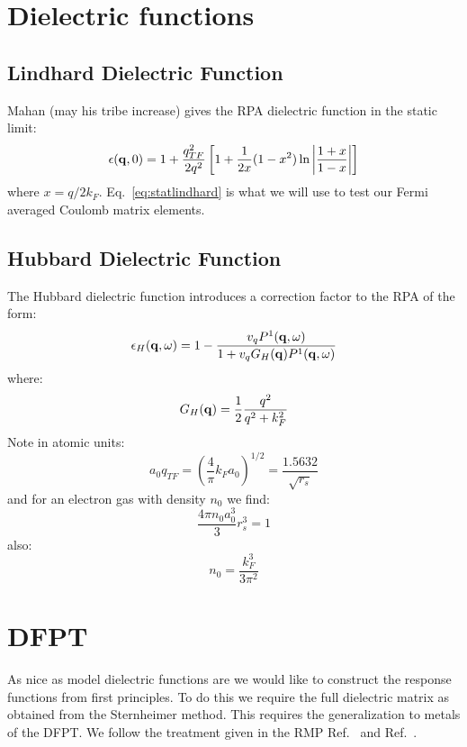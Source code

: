 \documentclass{article}
\def\q{{\bf q}}
\begin{document}
\section{Dielectric functions}
\subsection{Lindhard Dielectric Function}
Mahan (may his tribe increase) gives the RPA dielectric function in the static limit:
%
\begin{equation}
\label{eq:statlindhard}
\epsilon(\q,0) = 1 + \frac{q^{2}_{TF}}{2q^{2}}\left[1+\frac{1}{2x}(1-x^{2})\ln\left|\frac{1+x}{1-x}\right|\right]
\end{equation}
%
where $x = q/2k_{F}$.
Eq.~\ref{eq:statlindhard} is what we will use to test our Fermi averaged Coulomb matrix elements.

\subsection{Hubbard Dielectric Function}
The Hubbard dielectric function introduces a correction factor to the RPA of the form:
%
\begin{equation}
\epsilon_{H}(\q,\omega) = 1 - \frac{v_{q}P^{1}(\q,\omega)}{1+ v_{q}G_{H}(\q)P^{1}(\q,\omega)}
\end{equation}
%
where:
%
\begin{equation}
G_{H}(\q) = \frac{1}{2}\frac{q^{2}}{q^{2} + k^{2}_{F}}
\end{equation}
%
Note in atomic units:
%
\begin{equation}
a_{0}q_{TF} = (\frac{4}{\pi}k_{F}a_{0})^{1/2} = \frac{1.5632}{\sqrt{r_{s}}}
\end{equation}
%
and for an electron gas with density $n_{0}$ we find:
%
\begin{equation}
\frac{4\pi n_{0} a^{3}_{0}}{3}r^{3}_{s} = 1
\end{equation}
%
also: 
%
\begin{equation}
n_{0} = \frac{k^{3}_{F}}{3\pi^{2}}
\end{equation}

\section{DFPT}
As nice as model dielectric functions are we would like to construct the
response functions from first principles. To do this we require the full
dielectric matrix as obtained from the Sternheimer method. This requires
the generalization to metals of the DFPT. We follow the treatment given in
the RMP Ref.~\cite{baroni01} and Ref.~\cite{degironcoli95}.
\end{document}
